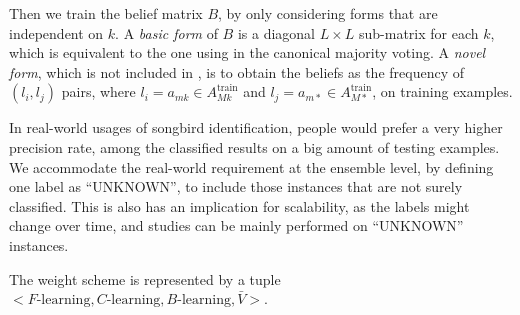 Then we train the belief matrix $B$, by only considering forms that are independent on $k$. A \emph{basic form} of $B$ is a diagonal $L\times L$ sub-matrix for each $k$, which is equivalent to the one using in the canonical majority voting. A \emph{novel form}, which is not included in \cite{rokach2010ensemble}, is to obtain the beliefs as the frequency of $(l_i, l_j)$ pairs, where $l_i=a_{mk} \in A_{Mk}^\text{train}$ and $l_j=a_{m*} \in A_{M*}^\text{train}$, on training examples.

In real-world usages of songbird identification, people would prefer a very higher precision rate, among the classified results on a big amount of testing examples. We accommodate the real-world requirement at the ensemble level, by defining one label as ``UNKNOWN'', to include those instances that are not surely classified. This is also has an implication for scalability, as the labels might change over time, and studies can be mainly performed on ``UNKNOWN'' instances.

The weight scheme is represented by a tuple $<F\text{-learning}, C\text{-learning}, B\text{-learning}, \bar{V}>$.





